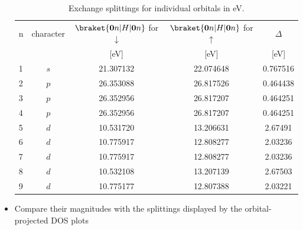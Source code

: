 \begin{itemize}
 \begin{table}[h!]
 \centering
	\captionsetup{width=.5\textwidth}
	\caption{Exchange splittings for individual orbitals in eV.}
 \begin{tabular}{@{} lcccc @{}}\toprule[1.5pt]
     n &  character &    $\braket{\boldsymbol{0}n\vert H \vert \boldsymbol{0}n}$ for $\downarrow$ & $\braket{\boldsymbol{0}n \vert H \vert \boldsymbol{0}n}$ for $\uparrow$ & $\Delta$ \\
      & & [eV] & [eV] & [eV] \\\midrule
     1 &    $s$ &   21.307132  & 22.074648 & 0.767516 \\
     2 &    $p$ & 26.353088  & 26.817526 & 0.464438 \\
     3 &    $p$ &  26.352956  & 26.817207 & 0.464251 \\
     4 &    $p$ &  26.352956  & 26.817207 & 0.464251 \\
     5 &    $d$ &  10.531720  & 13.206631 & 2.67491 \\
     6 &    $d$ &   10.775917  & 12.808277 & 2.03236 \\
     7 &    $d$ &   10.775917  & 12.808277 & 2.03236 \\
     8 &    $d$ &   10.532108  & 13.207139 & 2.67503 \\
     9 &    $d$ &   10.775177  & 12.807388 & 2.03221  \\\bottomrule[1pt]
\end{tabular}\label{tab8.2}
\end{table}


\item Compare their magnitudes with the splittings displayed by the orbital-projected DOS plots


\end{itemize}
